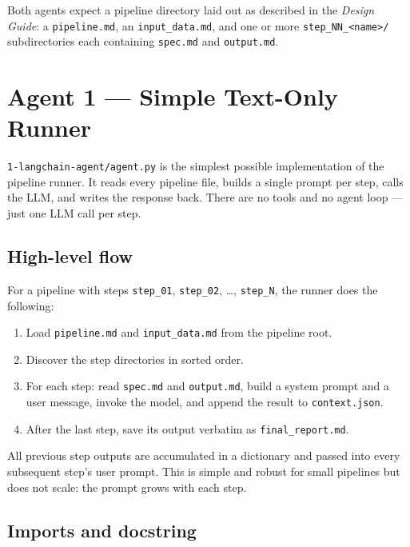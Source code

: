 \documentclass[12pt, a4paper]{article}
\begin{document}
Both agents expect a pipeline directory laid out as described in the \textit{Design Guide}: a \texttt{pipeline.md}, an \texttt{input\_data.md}, and one or more \texttt{step\_NN\_<name>/} subdirectories each containing \texttt{spec.md} and \texttt{output.md}.

\section{Agent 1 — Simple Text-Only Runner}

\texttt{1-langchain-agent/agent.py} is the simplest possible implementation of the pipeline runner. It reads every pipeline file, builds a single prompt per step, calls the LLM, and writes the response back. There are no tools and no agent loop — just one LLM call per step.

\subsection{High-level flow}

For a pipeline with steps \texttt{step\_01}, \texttt{step\_02}, \ldots, \texttt{step\_N}, the runner does the following:

\begin{enumerate}[leftmargin=1.5em]
  \item Load \texttt{pipeline.md} and \texttt{input\_data.md} from the pipeline root.
  \item Discover the step directories in sorted order.
  \item For each step: read \texttt{spec.md} and \texttt{output.md}, build a system prompt and a user message, invoke the model, and append the result to \texttt{context.json}.
  \item After the last step, save its output verbatim as \texttt{final\_report.md}.
\end{enumerate}

All previous step outputs are accumulated in a dictionary and passed into every subsequent step's user prompt. This is simple and robust for small pipelines but does not scale: the prompt grows with each step.

\subsection{Imports and docstring}
\end{document}
